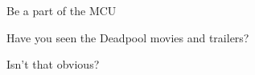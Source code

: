 \documentclass[11pt, a4paper]{awesome-cv}
\begin{document}
\makecvheader

\makelettertitle

\begin{cvletter}
Be a part of the MCU

Have you seen the Deadpool movies and trailers?

Isn't that obvious?

\end{cvletter}

\end{document}
